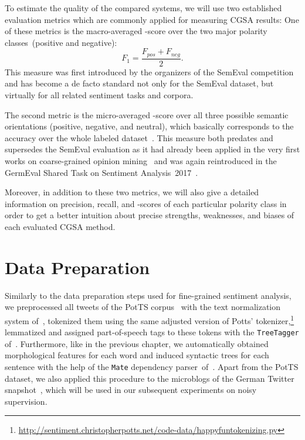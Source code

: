 To estimate the quality of the compared systems, we will use two
established evaluation metrics which are commonly applied for
measuring CGSA results: One of these metrics is the macro-averaged
\F-score over the two major polarity classes~(positive and negative):
{ \small%
  \begin{equation*}
    F_1 = \frac{F_{pos} + F_{neg}}{2}.
  \end{equation*}%
  \normalsize%
}%
This measure was first introduced by the organizers of the SemEval
competition~\cite{Nakov:13,Rosenthal:14,Rosenthal:15} and has become a
de facto standard not only for the SemEval dataset, but virtually for
all related sentiment tasks and corpora.

The second metric is the micro-averaged \F-score over all three
possible semantic orientations (positive, negative, and neutral),
which basically corresponds to the accuracy over the whole labeled
dataset~\cite[cf.][p.~577]{Manning:99}.  This measure both predates
and supersedes the SemEval evaluation as it had already been applied
in the very first works on coarse-grained opinion
mining~\cite{Wiebe:99,Das:01,Read:05,Kennedy:06,Go:09} and was again
reintroduced in the GermEval Shared Task on Sentiment
Analysis~2017~\cite{Biemann:17}.

Moreover, in addition to these two metrics, we will also give a
detailed information on precision, recall, and \F-scores of each
particular polarity class in order to get a better intuition about
precise strengths, weaknesses, and biases of each evaluated CGSA
method.

\section{Data Preparation}\label{sec:cgsa:data}

Similarly to the data preparation steps used for fine-grained
sentiment analysis, we preprocessed all tweets of the PotTS
corpus~\cite{Sidarenka:16} with the text normalization system
of~\citet{Sidarenka:13}, tokenized them using the same adjusted
version of Potts'
tokenizer,\footnote{\url{http://sentiment.christopherpotts.net/code-data/happyfuntokenizing.py}}
lemmatized and assigned part-of-speech tags to these tokens with the
\texttt{TreeTagger} of~\citet{Schmid:95}.  Furthermore, like in the
previous chapter, we automatically obtained morphological features for
each word and induced syntactic trees for each sentence with the help
of the \texttt{Mate} dependency parser~of~\citet{Bohnet:13}. Apart
from the PotTS dataset, we also applied this procedure to the
microblogs of the German Twitter snapshot~\cite{Scheffler:14}, which
will be used in our subsequent experiments on noisy supervision.

